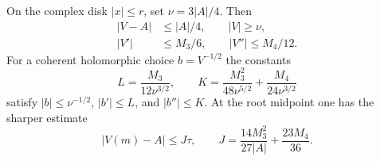 \begin{lemma}\label{lem:eventunit}
On the complex disk $|x|\leq r$, set $\nu=3|A|/4$. Then
\begin{align}
 |V-A|&\leq|A|/4,\qquad |V|\geq\nu,\label{eq:unitfloor}\\
 |V'|&\leq M_3/6,\qquad |V''|\leq M_4/12.\label{eq:unitderivatives}
\end{align}
For a coherent holomorphic choice $b=V^{-1/2}$ the constants
\begin{equation}\label{eq:eventLK}
 L=\frac{M_3}{12\nu^{3/2}},\qquad
 K=\frac{M_3^2}{48\nu^{5/2}}+\frac{M_4}{24\nu^{3/2}}
\end{equation}
satisfy $|b|\leq\nu^{-1/2}$, $|b'|\leq L$, and $|b''|\leq K$.
At the root midpoint one has the sharper estimate
\begin{equation}\label{eq:Jmidpoint}
 |V(m)-A|\leq J\tau,
 \qquad J=\frac{14M_3^2}{27|A|}+\frac{23M_4}{36}.
\end{equation}
\end{lemma}
